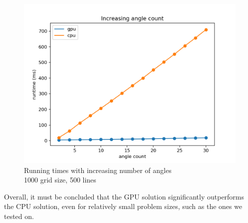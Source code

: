 \begin{figure}[H]
    \centering
    \captionsetup{justification=centering,margin=2cm}
    \includegraphics[scale=0.6]{figures/anglesGPU_anglesCPU.png}
    \caption{Running times with increasing number of angles\\\hspace{\textwidth}1000 grid size, 500 lines}\label{bench_angles}
\end{figure}
Overall, it must be concluded that the GPU solution significantly outperforms the CPU solution, even for relatively small problem sizes, such as the ones we tested on. 

